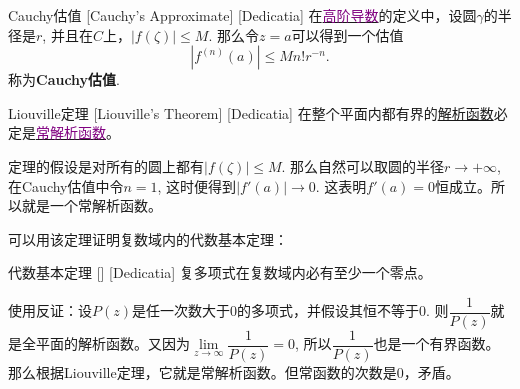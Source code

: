 \documentclass[UTF8]{ctexart}
\newcommand{\hyperrefc}[2]{\hyperref[#1]{\textcolor{purple}{#2}}}
\newcommand{\AnalyticalFunction}{\hyperref[dfn:AnalyticalFunction]{解析函数}}
\begin{document}
\begin{dfn}
    [UUID]
    {Cauchy估值}
    [Cauchy's Approximate]
    [Dedicatia]
    在\hyperrefc{dfn:HighOrderedDerivative}{高阶导数}的定义中，设圆$\gamma$的半径是$r$, 并且在$C$上，$|f(\zeta)|\leqslant M$. 那么令$z=a$可以得到一个估值
    \[|f^{(n)}(a)|\leqslant Mn!r^{-n}.\]
    称为\textbf{Cauchy估值}.
\end{dfn}
\begin{thm}
    [UUID]
    {Liouville定理}
    [Liouville's Theorem]
    [Dedicatia]
    在整个平面内都有界的\AnalyticalFunction 必定是\hyperrefc{dfn:TrivialAnalyticalFunction}{常解析函数}。
\end{thm}
\begin{prf}
    定理的假设是对所有的圆上都有$|f(\zeta)|\leqslant M$. 那么自然可以取圆的半径$r\to+\infty $, 在Cauchy估值中令$n=1$, 这时便得到$|f'(a)|\to 0$. 这表明$f'(a)=0$恒成立。所以就是一个常解析函数。
\end{prf}
可以用该定理证明复数域内的代数基本定理：
\begin{thm}
    [UUID]
    {代数基本定理}
    []
    [Dedicatia]
    复多项式在复数域内必有至少一个零点。
\end{thm}
\begin{prf}
    使用反证：设$P(z)$是任一次数大于0的多项式，并假设其恒不等于0. 则$\dfrac{1}{P(z)}$就是全平面的解析函数。又因为$\lim\limits_{z\to\infty}\dfrac{1}{P(z)}=0$, 所以$\dfrac{1}{P(z)}$也是一个有界函数。那么根据Liouville定理，它就是常解析函数。但常函数的次数是0，矛盾。
\end{prf}
\end{document}
